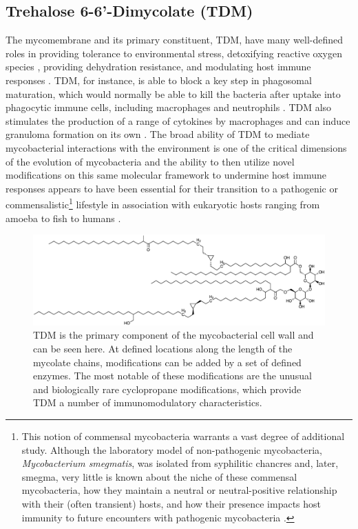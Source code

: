 \subsection{Trehalose 6\hyp{}6'\hyp{}Dimycolate (TDM)}\label{tdm}

The mycomembrane and its primary constituent, TDM, have many well\hyp{}defined roles in providing tolerance to environmental stress, detoxifying reactive oxygen species \citep{Chan1989}, providing dehydration resistance, and modulating host immune responses \citep{Lima2001, Ryll2001, Harland2008, Patin2017b, Asmar2016, Das2013a, Hunter2016}. TDM, for instance, is able to block a key step in phagosomal maturation, which would normally be able to kill the bacteria after uptake into phagocytic immune cells, including macrophages and neutrophils \citep{Axelrod2008, Indrigo2003, Spargo1991}. TDM also stimulates the production of a range of cytokines by macrophages and can induce granuloma formation on its own \citep{Korf2005}. The broad ability of TDM to mediate mycobacterial interactions with the environment is one of the critical dimensions of the evolution of mycobacteria and the ability to then utilize novel modifications on this same molecular framework to undermine host immune responses appears to have been essential for their transition to a pathogenic or commensalistic\footnote{This notion of commensal mycobacteria warrants a vast degree of additional study. Although the laboratory model of non\hyp{}pathogenic mycobacteria, \textit{Mycobacterium smegmatis}, was isolated from syphilitic chancres and, later, smegma, very little is known about the niche of these commensal mycobacteria, how they maintain a neutral or neutral\hyp{}positive relationship with their (often transient) hosts, and how their presence impacts host immunity to future encounters with pathogenic mycobacteria \citep{Robinson2018}.} lifestyle in association with eukaryotic hosts ranging from amoeba to fish to humans \citep{Hagedorn2009, Salah2009, Delafont2014, Honda2018, Falkinham2009}.

\begin{figure}
\centering
\includegraphics[width=\textwidth]{images/tdm.pdf}
\caption{TDM is the primary component of the mycobacterial cell wall and can be seen here. At defined locations along the length of the mycolate chains, modifications can be added by a set of defined enzymes. The most notable of these modifications are the unusual and biologically rare cyclopropane modifications, which provide TDM a number of immunomodulatory characteristics.}
\label{figure:tdm}
\end{figure}

